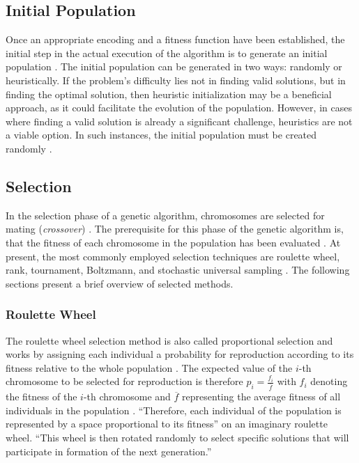 \documentclass[sigconf]{acmart}
\begin{document}


\subsection{Initial Population}
Once an appropriate encoding and a fitness function have been established,
the initial step in the actual execution of the algorithm is to generate an
initial population \cite{Affenzeller2009}.
The initial population can be generated in two ways: randomly or heuristically.
If the problem's difficulty lies not in finding valid solutions, but in finding
the optimal solution, then heuristic initialization may be a beneficial
approach, as it could facilitate the evolution of the population.
However, in cases where finding a valid solution is already a significant
challenge, heuristics are not a viable option. In such instances, the initial
population must be created randomly \cite{Affenzeller2009}.

\subsection{Selection}
In the selection phase of a genetic algorithm, chromosomes are selected for
mating (\textit{crossover}) \cite{Affenzeller2009}.
The prerequisite for this phase of the genetic algorithm is, that the
fitness of each chromosome in the population has been evaluated
\cite{Affenzeller2009}.
At present, the most commonly employed selection techniques are roulette wheel,
rank, tournament, Boltzmann, and stochastic universal sampling
\cite{Katoch2021}.
The following sections present a brief overview of selected methods.

\subsubsection{Roulette Wheel}
The roulette wheel selection method is also called proportional selection
and works by assigning each individual a probability for reproduction according
to its fitness relative to the whole population \cite{Affenzeller2009}.
The expected value of the $i$-th chromosome to be selected for reproduction
is therefore $p_i = \frac{f_i}{\overline{f}}$ with $f_i$ denoting the fitness
of the $i$-th chromosome and $\overline{f}$ representing the average fitness
of all individuals in the population \cite{Affenzeller2009}.
\enquote{Therefore, each individual of the population is represented by a
space proportional to its fitness}\cite{Affenzeller2009} on an imaginary
roulette wheel.
\enquote{This wheel is then rotated randomly to select specific solutions that
will participate in formation of the next generation.} \cite{Katoch2021}
\end{document}
